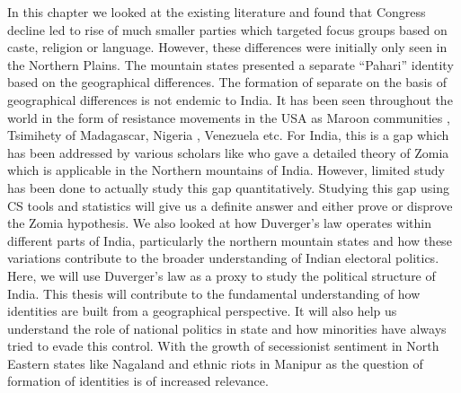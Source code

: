 \begin{sloppypar}
 In this chapter we looked at the existing literature and found that Congress decline led to rise of much smaller parties which targeted focus groups based on caste, religion or language. However, these differences were initially only seen in the Northern Plains. The mountain states presented a separate ``Pahari'' identity based on the geographical differences. The formation of separate on the basis of geographical differences is not endemic to India. It has been seen throughout the world in the form of resistance movements in the USA as Maroon communities \citep{price2020rainforest}, Tsimihety of Madagascar, Nigeria , Venezuela etc. For India, this is a gap which has been addressed by various scholars like \cite{scott2005civilizations} who gave a detailed theory of Zomia which is applicable in the Northern mountains of India. However, limited study has been done to actually study this gap quantitatively. Studying this gap using CS tools and statistics will give us a definite answer and either prove or disprove the Zomia hypothesis. We also looked at how Duverger's law operates within different parts of India, particularly the northern mountain states and how these variations contribute to the broader understanding of Indian electoral politics. Here, we will use Duverger's law as a proxy to study the political structure of India. This thesis will contribute to the fundamental understanding of how identities are built from a geographical perspective. It will also help us understand the role of national politics in state and how minorities have always tried to evade this control. With the growth of secessionist sentiment in North Eastern states like Nagaland and ethnic riots in Manipur as the question of formation of identities is of increased relevance.

\end{sloppypar}
